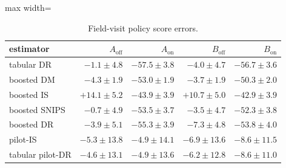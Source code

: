\begin{table}[!htbp]
\centering
\caption{Field-visit policy score errors.}
\label{tab:campaignvisit}
\small
\begin{adjustbox}{max width=\linewidth}
\begin{tabular}{lrrrr}
\toprule
estimator & $A_{\mathrm{off}}$ & $A_{\mathrm{on}}$ & $B_{\mathrm{off}}$ & $B_{\mathrm{on}}$ \\
\midrule
tabular DR & $-1.1 \pm 4.8$ & $-57.5 \pm 3.8$ & $-4.0 \pm 4.7$ & $-56.7 \pm 3.6$ \\
boosted DM & $-4.3 \pm 1.9$ & $-53.0 \pm 1.9$ & $-3.7 \pm 1.9$ & $-50.3 \pm 2.0$ \\
boosted IS & $+14.1 \pm 5.2$ & $-43.9 \pm 3.9$ & $+10.7 \pm 5.0$ & $-42.9 \pm 3.9$ \\
boosted SNIPS & $-0.7 \pm 4.9$ & $-53.5 \pm 3.7$ & $-3.5 \pm 4.7$ & $-52.3 \pm 3.8$ \\
boosted DR & $-3.9 \pm 5.1$ & $-55.3 \pm 3.9$ & $-7.3 \pm 4.8$ & $-53.8 \pm 4.0$ \\
pilot-IS & $-5.3 \pm 13.8$ & $-4.9 \pm 14.1$ & $-6.9 \pm 13.6$ & $-8.6 \pm 11.5$ \\
tabular pilot-DR & $-4.6 \pm 13.1$ & $-4.9 \pm 13.6$ & $-6.2 \pm 12.8$ & $-8.6 \pm 11.0$ \\
\bottomrule
\end{tabular}
\end{adjustbox}
\end{table}

